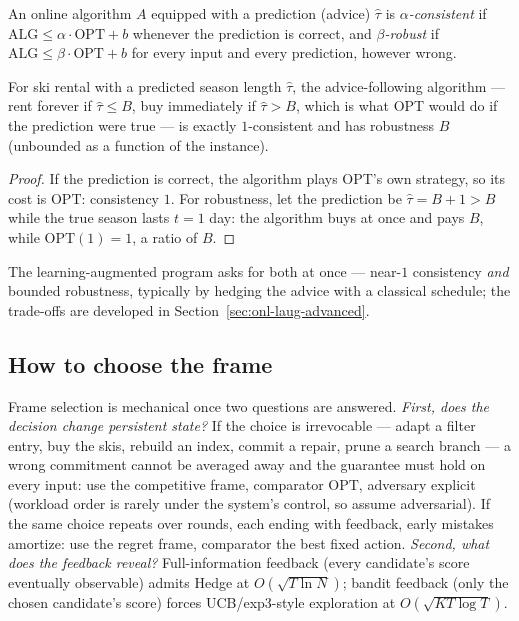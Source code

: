 \begin{definition}\label{def:onl-laug}
An online algorithm $A$ equipped with a prediction (advice) $\hat\tau$ is
\emph{$\alpha$-consistent} if $\mathrm{ALG} \le \alpha\cdot\mathrm{OPT} + b$ whenever
the prediction is correct, and \emph{$\beta$-robust} if
$\mathrm{ALG} \le \beta\cdot\mathrm{OPT} + b$ for every input and every prediction,
however wrong.
\end{definition}

\begin{proposition}\label{prop:onl-laug-fragile}
For ski rental with a predicted season length $\hat\tau$, the advice-following
algorithm --- rent forever if $\hat\tau \le B$, buy immediately if $\hat\tau > B$, which
is what OPT would do if the prediction were true --- is exactly $1$-consistent and has
robustness $B$ (unbounded as a function of the instance). \eop
\end{proposition}

\begin{proof}
If the prediction is correct, the algorithm plays OPT's own strategy, so its cost is
$\mathrm{OPT}$: consistency $1$. For robustness, let the prediction be
$\hat\tau = B+1 > B$ while the true season lasts $t = 1$ day: the algorithm buys at
once and pays $B$, while $\mathrm{OPT}(1) = 1$, a ratio of $B$.
\end{proof}

The learning-augmented program asks for both at once --- near-$1$ consistency
\emph{and} bounded robustness, typically by hedging the advice with a classical
schedule; the trade-offs are developed in Section~\ref{sec:onl-laug-advanced}.

\subsection{How to choose the frame}
\label{sec:onl-choose}

Frame selection is mechanical once two questions are answered. \emph{First, does the
decision change persistent state?} If the choice is irrevocable --- adapt a filter
entry, buy the skis, rebuild an index, commit a repair, prune a search branch --- a
wrong commitment cannot be averaged away and the guarantee must hold on every input: use
the competitive frame, comparator $\mathrm{OPT}$, adversary explicit (workload order is
rarely under the system's control, so assume adversarial). If the same choice repeats
over rounds, each ending with feedback, early mistakes amortize: use the regret frame,
comparator the best fixed action. \emph{Second, what does the feedback reveal?}
Full-information feedback (every candidate's score eventually observable) admits Hedge
at $O(\sqrt{T\ln N})$; bandit feedback (only the chosen candidate's score) forces
UCB/exp3-style exploration at $O(\sqrt{KT\log T})$.

